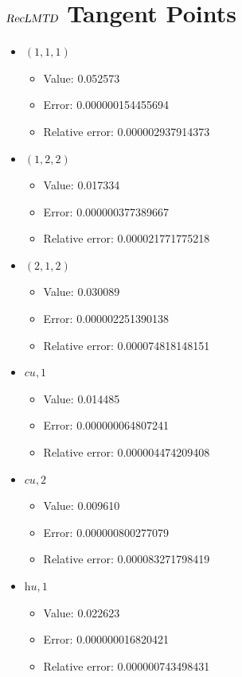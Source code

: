 \documentclass{article}%
\begin{document}
\section{$\textsl{RecLMTD}$ Tangent Points}%
\thispagestyle{plain}%
\begin{itemize}%
	\item $(1, 1, 1)$%
	\begin{itemize}%
		\item Value: 0.052573%
		\item Error: 0.000000154455694%
		\item Relative error: 0.000002937914373%
	\end{itemize}%
	\item $(1, 2, 2)$%
	\begin{itemize}%
		\item Value: 0.017334%
		\item Error: 0.000000377389667%
		\item Relative error: 0.000021771775218%
	\end{itemize}%
	\item $(2, 1, 2)$%
	\begin{itemize}%
		\item Value: 0.030089%
		\item Error: 0.000002251390138%
		\item Relative error: 0.000074818148151%
	\end{itemize}%
	\item $\textit{cu},1$%
	\begin{itemize}%
		\item Value: 0.014485%
		\item Error: 0.000000064807241%
		\item Relative error: 0.000004474209408%
	\end{itemize}%
	\item $\textit{cu},2$%
	\begin{itemize}%
		\item Value: 0.009610%
		\item Error: 0.000000800277079%
		\item Relative error: 0.000083271798419%
	\end{itemize}%
	\item $\textit{hu},1$%
	\begin{itemize}%
		\item Value: 0.022623%
		\item Error: 0.000000016820421%
		\item Relative error: 0.000000743498431%
	\end{itemize}%
\end{itemize}%
\end{document}
